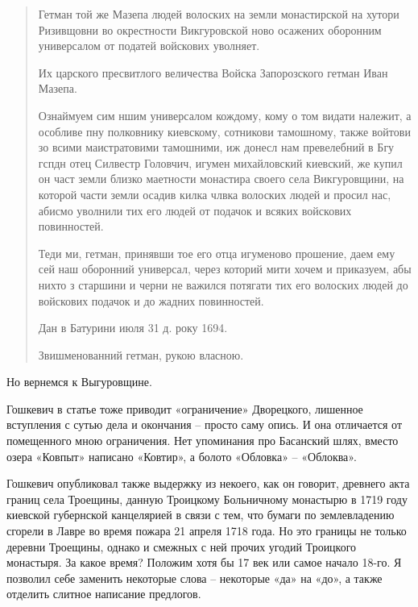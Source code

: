 \begin{quotation}
Гетман той же Мазепа людей волоских на земли монастирской на хутори Ризивщовни во окрестности Викгуровской ново осажених оборонним универсалом от податей войскових уволняет.

Их царского пресвитлого величества Войска Запорозского гетман Иван Мазепа.

Ознаймуем сим ншим универсалом кождому, кому о том видати належит, а особливе пну полковнику киевскому, сотникови тамошному, также войтови зо всими маистратовими тамошними, иж донесл нам превелебний в Бгу гспдн отец Силвестр Головчич, игумен михайловский киевский, же купил он част земли близко маетности монастира своего села Викгуровщини, на которой части земли осадив килка члвка волоских людей и просил нас, абисмо уволнили тих его людей от подачок и всяких войскових повинностей.

Теди ми, гетман, принявши тое его отца игуменово прошение, даем ему сей наш оборонний универсал, через которий мити хочем и приказуем, абы нихто з старшини и черни не важился потягати тих его волоских людей до войскових подачок и до жадних повинностей.

Дан в Батурини июля 31 д. року 1694.

Звишменованний гетман, рукою власною.
\end{quotation}

Но вернемся к Выгуровщине. 

Гошкевич в статье тоже приводит «ограничение» Дворецкого, лишенное вступления с сутью дела и окончания – просто саму опись. И она отличается от помещенного мною ограничения. Нет упоминания про Басанский шлях, вместо озера «Ковпыт» написано «Ковтир», а болото «Обловка» – «Облоква».

Гошкевич опубликовал также выдержку из некоего, как он говорит, древнего акта границ села Троещины, данную Троицкому Больничному монастырю в 1719 году киевской губернской канцелярией в связи с тем, что бумаги по землевладению сгорели в Лавре во время пожара 21 апреля 1718 года. Но это границы не только деревни Троещины, однако и смежных с ней прочих угодий Троицкого монастыря. За какое время? Положим хотя бы 17 век или самое начало 18-го. Я позволил себе заменить некоторые слова – некоторые «да» на «до», а также отделить слитное написание предлогов.

